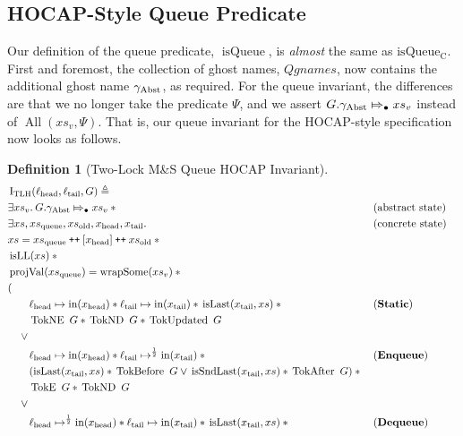 \documentclass[a4paper, 10pt]{report}
\theoremstyle{definition}
\newtheorem{definition}{Definition}[section]
\newcommand{\msq}{M\&S Queue}
\newcommand{\tlmsq}{Two-Lock \msq{}}
\newcommand{\isqueue}{\operatorname{isQueue}}
\newcommand{\isqueueconc}{\operatorname{isQueue_{C}}}
\newcommand{\TLQueueInvariantHocap}{\operatorname{I_{TLH}}}
\newcommand{\Qgnames}{Qgnames}
\newcommand{\xsc}{xs}
\newcommand{\xsqueue}{xs_{\mathrm{queue}}}
\newcommand{\xsold}{xs_{\mathrm{old}}}
\newcommand{\isLL}{\operatorname{isLL}}
\newcommand{\AllP}{\operatorname{All}}
\newcommand{\projval}{\operatorname{projVal}}
\newcommand{\wrapsome}{\operatorname{wrapSome}}
\newcommand{\isLast}{\operatorname{isLast}}
\newcommand{\isSndLast}{\operatorname{isSndLast}}
\newcommand{\locN}[1]{\loc_{\mathrm{#1}}}
\newcommand{\lochead}{\locN{head}}
\newcommand{\loctail}{\locN{tail}}
\newcommand{\nIn}[1]{\operatorname{in}(#1)}
\newcommand{\node}{x}
\newcommand{\nodeN}[1]{\node_{\mathrm{#1}}}
\newcommand{\nodehead}{\nodeN{head}}
\newcommand{\nodetail}{\nodeN{tail}}
\newcommand{\absvalueList}{xs_v}
\newcommand{\StaticState}{\textbf{Static}\xspace}
\newcommand{\EnqueueState}{\textbf{Enqueue}\xspace}
\newcommand{\DequeueState}{\textbf{Dequeue}\xspace}
\newcommand{\Qg}{G}
\newcommand{\gabst}{\gname_{\mathrm{Abst}}}
\newcommand{\TokE}[1]{\operatorname{TokE} ~ #1}
\newcommand{\TokEQg}{\TokE{\Qg}}
\newcommand{\TokNE}[1]{\operatorname{TokNE} ~ #1}
\newcommand{\TokNEQg}{\TokNE{\Qg}}
\newcommand{\TokND}[1]{\operatorname{TokND} ~ #1}
\newcommand{\TokNDQg}{\TokND{\Qg}}
\newcommand{\TokBefore}[1]{\operatorname{TokBefore} ~ #1}
\newcommand{\TokBeforeQg}{\TokBefore{\Qg}}
\newcommand{\TokAfter}[1]{\operatorname{TokAfter} ~ #1}
\newcommand{\TokAfterQg}{\TokAfter{\Qg}}
\newcommand{\TokUpdated}[1]{\operatorname{TokUpdated} ~ #1}
\newcommand{\TokUpdatedQg}{\TokUpdated{\Qg}}
\newcommand\catenate{\mathbin{\text{\ttfamily\upshape ++}}}
\newcommand{\abstractstateauth}[2]{#1 \Mapsto_{\bullet} #2}
\begin{document}
\subsection{HOCAP-Style Queue Predicate}
\label{TLMSQSPECS:hocap:sub:hocap-queue-pred}

Our definition of the queue predicate, $\isqueue$, is \emph{almost} the same as $\isqueueconc$. First and foremost, the collection of ghost names, $\Qgnames$, now contains the additional ghost name $\gabst$, as required. For the queue invariant, the differences are that we no longer take the predicate $\Psi$, and we assert $\abstractstateauth{\Qg.\gabst}{\absvalueList}$ instead of $\AllP(\absvalueList, \Psi)$. That is, our queue invariant for the HOCAP-style specification now looks as follows.
\begin{definition}[\tlmsq{} HOCAP Invariant]\label{TLMSQ:spec:hocap:invariant}
  \begin{align*}
    &\TLQueueInvariantHocap(\lochead, \loctail, \Qg) \eqdef\\
    &\Exists \absvalueList. \abstractstateauth{\Qg.\gabst}{\absvalueList} \star{} &&\text{(abstract state)}\\
    &\Exists \xsc, \xsqueue, \xsold, \nodehead, \nodetail . &&\text{(concrete state)}\\
    &\xsc = \xsqueue \catenate [\nodehead] \catenate \xsold \star{}\\
    &\isLL(\xsc) \star{}\\
    &\projval(\xsqueue) = \wrapsome(\absvalueList) \star{}\\
    &(\\
    &\quad\quad\lochead \mapsto \nIn{\nodehead} \star{} \loctail \mapsto \nIn{\nodetail} \star{} \isLast(\nodetail, \xsc) \star{} &&\text{(\StaticState)}\\
    &\quad\quad \TokNEQg \star{} \TokNDQg \star{} \TokUpdatedQg\\
    &\quad\lor{}\\
    &\quad\quad\lochead \mapsto \nIn{\nodehead} \star{} \loctail \mapsto^{\frac{1}{2}} \nIn{\nodetail} \star{} &&\text{(\EnqueueState)}\\
    &\quad\quad (\isLast(\nodetail, \xsc) \star{} \TokBeforeQg \lor{} \isSndLast(\nodetail, \xsc) \star{} \TokAfterQg) \star{}\\
    &\quad\quad \TokEQg \star{} \TokNDQg\\
    &\quad\lor{}\\
    &\quad\quad\lochead \mapsto^{\frac{1}{2}} \nIn{\nodehead} \star{} \loctail \mapsto \nIn{\nodetail} \star{} \isLast(\nodetail, \xsc) \star{} &&\text{(\DequeueState)}\\

\end{align*}
\end{definition}
\end{document}
